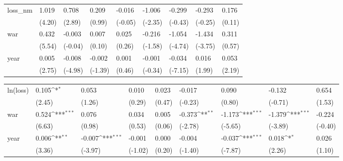 \begin{tabular}{p{1.5cm} p{2cm} p{1.7cm} p{1.7cm} p{1.7cm} p{1.7cm} p{1.7cm} p{1.7cm} p{1.7cm}}
\hline
loss\_nm         &    1.019\sym{***}&    0.708\sym{**} &    0.209         &   -0.016         &   -1.006\sym{*}  &   -0.299         &   -0.293         &    0.176         \\
                &   (4.20)         &   (2.89)         &   (0.99)         &  (-0.05)         &  (-2.35)         &  (-0.43)         &  (-0.25)         &   (0.11)         \\
war             &    0.432\sym{***}&   -0.003         &    0.007         &    0.025         &   -0.216         &   -1.054\sym{***}&   -1.434\sym{***}&    0.311         \\
                &   (5.54)         &  (-0.04)         &   (0.10)         &   (0.26)         &  (-1.58)         &  (-4.74)         &  (-3.75)         &   (0.57)         \\
year            &    0.005\sym{**} &   -0.008\sym{***}&   -0.002         &    0.001         &   -0.001         &   -0.034\sym{***}&    0.016         &    0.053\sym{*}  \\
                &   (2.75)         &  (-4.98)         &  (-1.39)         &   (0.46)         &  (-0.34)         &  (-7.15)         &   (1.99)         &   (2.19)         \\
\end{tabular}
\def\sym#1{\ifmmode^{#1}\else\(^{#1}\)\fi}
\begin{tabular}{p{1.5cm} p{2cm} p{1.7cm} p{1.7cm} p{1.7cm} p{1.7cm} p{1.7cm} p{1.7cm} p{1.7cm}}
\hline
ln(loss)        &    0.105\sym{*}  &    0.053         &    0.010         &    0.023         &   -0.017         &    0.090         &   -0.132         &    0.654         \\
                &   (2.45)         &   (1.26)         &   (0.29)         &   (0.47)         &  (-0.23)         &   (0.80)         &  (-0.71)         &   (1.53)         \\
war             &    0.524\sym{***}&    0.076         &    0.034         &    0.005         &   -0.373\sym{**} &   -1.173\sym{***}&   -1.379\sym{***}&   -0.224         \\
                &   (6.63)         &   (0.98)         &   (0.53)         &   (0.06)         &  (-2.78)         &  (-5.65)         &  (-3.89)         &  (-0.40)         \\
year            &    0.006\sym{**} &   -0.007\sym{***}&   -0.001         &    0.000         &   -0.004         &   -0.037\sym{***}&    0.018\sym{*}  &    0.026         \\
                &   (3.36)         &  (-3.97)         &  (-1.02)         &   (0.20)         &  (-1.40)         &  (-7.87)         &   (2.26)         &   (1.10)         \\
\end{tabular}
